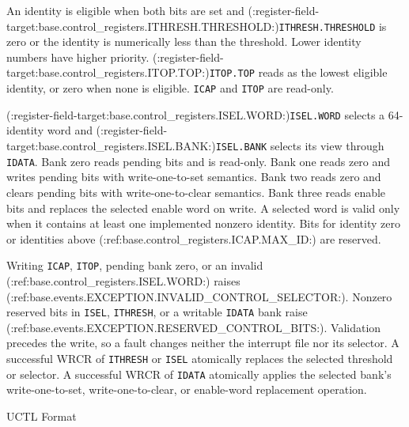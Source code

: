 An identity is eligible when both bits are set and (:register-field-target:base.control_registers.ITHRESH.THRESHOLD:)\texttt{ITHRESH.THRESHOLD} is zero or the identity is numerically
less than the threshold. Lower identity numbers have higher priority. (:register-field-target:base.control_registers.ITOP.TOP:)\texttt{ITOP.TOP} reads as the lowest eligible
identity, or zero when none is eligible. \texttt{ICAP} and \texttt{ITOP} are read-only.

(:register-field-target:base.control_registers.ISEL.WORD:)\texttt{ISEL.WORD} selects a 64-identity word and (:register-field-target:base.control_registers.ISEL.BANK:)\texttt{ISEL.BANK} selects its view through \texttt{IDATA}.
Bank zero reads pending bits and is read-only. Bank one reads zero and writes pending bits with write-one-to-set
semantics. Bank two reads zero and clears pending bits with write-one-to-clear semantics. Bank three reads enable
bits and replaces the selected enable word on write. A selected word is valid only when it contains at least one
implemented nonzero identity. Bits for identity zero or identities above (:ref:base.control_registers.ICAP.MAX_ID:) are reserved.

Writing \texttt{ICAP}, \texttt{ITOP}, pending bank zero, or an invalid (:ref:base.control_registers.ISEL.WORD:) raises
(:ref:base.events.EXCEPTION.INVALID_CONTROL_SELECTOR:). Nonzero reserved bits in \texttt{ISEL}, \texttt{ITHRESH},
or a writable \texttt{IDATA} bank raise (:ref:base.events.EXCEPTION.RESERVED_CONTROL_BITS:). Validation precedes the
write, so a fault changes neither the interrupt file nor its selector. A successful WRCR of \texttt{ITHRESH} or \texttt{ISEL}
atomically replaces the selected threshold or selector. A successful WRCR of \texttt{IDATA} atomically applies the selected bank's
write-one-to-set, write-one-to-clear, or enable-word replacement operation.

\begin{BedrockFormatDiagram}{UCTL Format}
\end{BedrockFormatDiagram}

